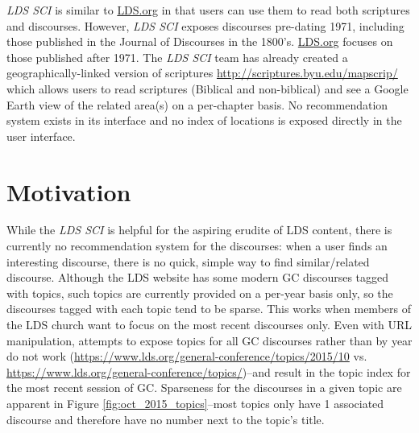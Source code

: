 \emph{LDS SCI} is similar to \url{LDS.org} in that users can use them to read both scriptures and discourses. However, \emph{LDS SCI} exposes discourses pre-dating 1971, including those published in the Journal of Discourses in the 1800’s. \url{LDS.org} focuses on those published after 1971. The \emph{LDS SCI} team has already created a geographically-linked version of scriptures \url{http://scriptures.byu.edu/mapscrip/} which allows users to read scriptures (Biblical and non-biblical) and see a Google Earth view of the related area(s) on a per-chapter basis. No recommendation system exists in its interface and no index of locations is exposed directly in the user interface.

\section{Motivation}
While the \emph{LDS SCI} is helpful for the aspiring erudite of LDS content, there is currently no recommendation system for the discourses: when a user finds an interesting discourse, there is no quick, simple way to find similar/related discourse. Although the LDS website has some modern GC discourses tagged with topics, such topics are currently provided on a per-year basis only, so the discourses tagged with each topic tend to be sparse. This works when members of the LDS church want to focus on the most recent discourses only. Even with URL manipulation, attempts to expose topics for all GC discourses rather than by year do not work (\url{https://www.lds.org/general-conference/topics/2015/10} vs. \url{https://www.lds.org/general-conference/topics/})--and result in the topic index for the most recent session of GC. Sparseness for the discourses in a given topic are apparent in Figure \ref{fig:oct_2015_topics}--most topics only have 1 associated discourse and therefore have no number next to the topic’s title.

